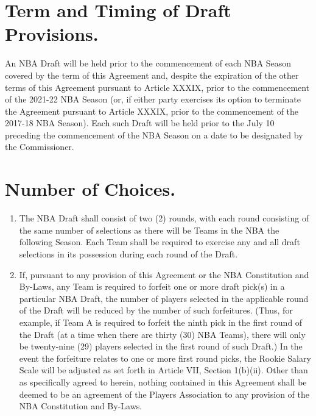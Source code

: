 \documentclass[
]{book}
\providecommand{\tightlist}{%
  \setlength{\itemsep}{0pt}\setlength{\parskip}{0pt}}
\begin{document}
\hypertarget{term-and-timing-of-draft-provisions.}{%
\section{Term and Timing of Draft Provisions.}\label{term-and-timing-of-draft-provisions.}}

An NBA Draft will be held prior to the commencement of each NBA Season covered by the term of this Agreement and, despite the expiration of the other terms of this Agreement pursuant to Article XXXIX, prior to the commencement of the 2021-22 NBA Season (or, if either party exercises its option to terminate the Agreement pursuant to Article XXXIX, prior to the commencement of the 2017-18 NBA Season). Each such Draft will be held prior to the July 10 preceding the commencement of the NBA Season on a date to be designated by the Commissioner.

\hypertarget{number-of-choices.}{%
\section{Number of Choices.}\label{number-of-choices.}}

\begin{enumerate}
\def\labelenumi{(\alph{enumi})}
\tightlist
\item
  The NBA Draft shall consist of two (2) rounds, with each round consisting of the same number of selections as there will be Teams in the NBA the following Season. Each Team shall be required to exercise any and all draft selections in its possession during each round of the Draft.
\item
  If, pursuant to any provision of this Agreement or the NBA Constitution and By-Laws, any Team is required to forfeit one or more draft pick(s) in a particular NBA Draft, the number of players selected in the applicable round of the Draft will be reduced by the number of such forfeitures. (Thus, for example, if Team A is required to forfeit the ninth pick in the first round of the Draft (at a time when there are thirty (30) NBA Teams), there will only be twenty-nine (29) players selected in the first round of such Draft.) In the event the forfeiture relates to one or more first round picks, the Rookie Salary Scale will be adjusted as set forth in Article VII, Section 1(b)(ii). Other than as specifically agreed to herein, nothing contained in this Agreement shall be deemed to be an agreement of the Players Association to any provision of the NBA Constitution and By-Laws.
\end{enumerate}
\end{document}
